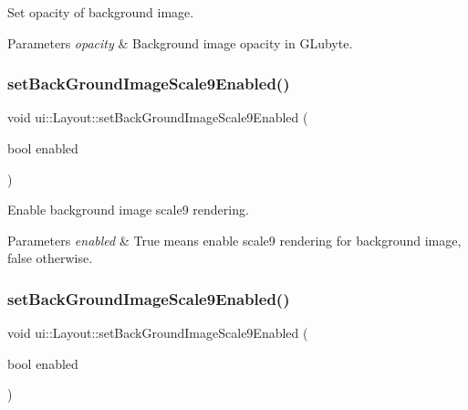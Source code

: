Set opacity of background image. 
\begin{DoxyParams}{Parameters}
{\em opacity} & Background image opacity in G\+Lubyte. \\
\hline
\end{DoxyParams}
\mbox{\label{classui_1_1Layout_a1d675f08f0d5d366562e39641a4b668c}} 
\subsubsection{\texorpdfstring{set\+Back\+Ground\+Image\+Scale9\+Enabled()}{setBackGroundImageScale9Enabled()}\hspace{0.1cm}{\footnotesize\ttfamily [1/2]}}
{\footnotesize\ttfamily void ui\+::\+Layout\+::set\+Back\+Ground\+Image\+Scale9\+Enabled (\begin{DoxyParamCaption}\item[{bool}]{enabled }\end{DoxyParamCaption})}

Enable background image scale9 rendering.


\begin{DoxyParams}{Parameters}
{\em enabled} & True means enable scale9 rendering for background image, false otherwise. \\
\hline
\end{DoxyParams}
\mbox{\label{classui_1_1Layout_a1d675f08f0d5d366562e39641a4b668c}} 
\subsubsection{\texorpdfstring{set\+Back\+Ground\+Image\+Scale9\+Enabled()}{setBackGroundImageScale9Enabled()}\hspace{0.1cm}{\footnotesize\ttfamily [2/2]}}
{\footnotesize\ttfamily void ui\+::\+Layout\+::set\+Back\+Ground\+Image\+Scale9\+Enabled (\begin{DoxyParamCaption}\item[{bool}]{enabled }\end{DoxyParamCaption})}

